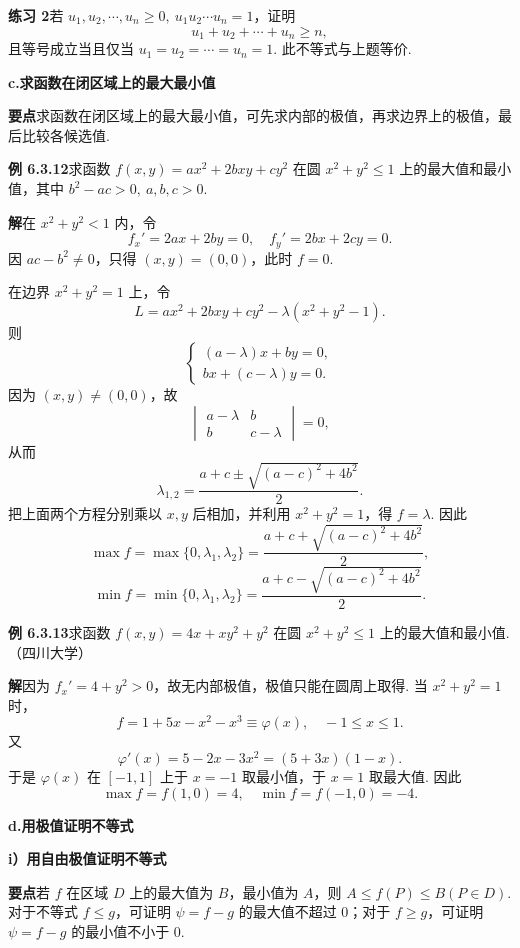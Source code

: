 \documentclass[UTF8,12pt,a4paper,fontset=fandol]{ctexart}
\begin{document}
\noindent\textbf{练习 2}\quad 若 $u_1,u_2,\cdots,u_n\ge0,\ u_1u_2\cdots u_n=1$，证明
\[
  u_1+u_2+\cdots+u_n\ge n,
\]
且等号成立当且仅当 $u_1=u_2=\cdots=u_n=1$. 此不等式与上题等价.

\noindent\textbf{c.\quad 求函数在闭区域上的最大最小值}

\noindent\textbf{要点}\quad 求函数在闭区域上的最大最小值，可先求内部的极值，再求边界上的极值，最后比较各候选值.

\noindent\textbf{例 6.3.12}\quad 求函数 $f(x,y)=ax^2+2bxy+cy^2$ 在圆 $x^2+y^2\le1$ 上的最大值和最小值，其中 $b^2-ac>0,\ a,b,c>0$.

\noindent\textbf{解}\quad 在 $x^2+y^2<1$ 内，令
\[
  f_x'=2ax+2by=0,\quad f_y'=2bx+2cy=0.
\]
因 $ac-b^2\ne0$，只得 $(x,y)=(0,0)$，此时 $f=0$.

在边界 $x^2+y^2=1$ 上，令
\[
  L=ax^2+2bxy+cy^2-\lambda(x^2+y^2-1).
\]
则
\[
  \begin{cases}
    (a-\lambda)x+by=0,\\
    bx+(c-\lambda)y=0.
  \end{cases}
\]
因为 $(x,y)\ne(0,0)$，故
\[
  \begin{vmatrix}
    a-\lambda&b\\
    b&c-\lambda
  \end{vmatrix}=0,
\]
从而
\[
  \lambda_{1,2}=\frac{a+c\pm\sqrt{(a-c)^2+4b^2}}{2}.
\]
把上面两个方程分别乘以 $x,y$ 后相加，并利用 $x^2+y^2=1$，得 $f=\lambda$. 因此
\[
  \max f=\max\{0,\lambda_1,\lambda_2\}
  =\frac{a+c+\sqrt{(a-c)^2+4b^2}}{2},
\]
\[
  \min f=\min\{0,\lambda_1,\lambda_2\}
  =\frac{a+c-\sqrt{(a-c)^2+4b^2}}{2}.
\]

\noindent\textbf{例 6.3.13}\quad 求函数 $f(x,y)=4x+xy^2+y^2$ 在圆 $x^2+y^2\le1$ 上的最大值和最小值.（四川大学）

\noindent\textbf{解}\quad 因为 $f_x'=4+y^2>0$，故无内部极值，极值只能在圆周上取得. 当 $x^2+y^2=1$ 时，
\[
  f=1+5x-x^2-x^3\equiv\varphi(x),\quad -1\le x\le1.
\]
又
\[
  \varphi'(x)=5-2x-3x^2=(5+3x)(1-x).
\]
于是 $\varphi(x)$ 在 $[-1,1]$ 上于 $x=-1$ 取最小值，于 $x=1$ 取最大值. 因此
\[
  \max f=f(1,0)=4,\quad \min f=f(-1,0)=-4.
\]

\noindent\textbf{d.\quad 用极值证明不等式}

\noindent\textbf{i）用自由极值证明不等式}

\noindent\textbf{要点}\quad 若 $f$ 在区域 $D$ 上的最大值为 $B$，最小值为 $A$，则 $A\le f(P)\le B(P\in D)$. 对于不等式 $f\le g$，可证明 $\psi=f-g$ 的最大值不超过 $0$；对于 $f\ge g$，可证明 $\psi=f-g$ 的最小值不小于 $0$.
\end{document}
